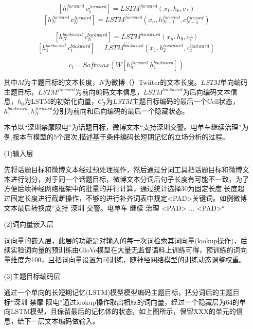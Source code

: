 \begin{equation}\label{lstm_f}[h^{forward}_{1}~c^{forward}_{1}] = LSTM^{forward}(x_1,h_0,c_T)\end{equation}
$$...$$
\begin{equation}\label{lstm_f}[h^{forward}_{N}~c^{forward}_{N}] = LSTM^{forward}(x_n,h^{forward}_{N-1},c^{forward}_{N-1})\end{equation}

\begin{equation}\label{lstm_f}[h^{backward}_{N}~c^{backward}_{N}] = LSTM^{backward}(x_n,h_0,c_T)\end{equation}
$$...$$
\begin{equation}\label{lstm_f}[h^{backward}_{1}~c^{backward}_{1}] = LSTM^{backward}(x_1,h^{backward}_{2},c^{backward}_{2})\end{equation}

\begin{equation}\label{lstm_f}c_i=Softmax(W[h^{forward}_n~h^{backward}_1])\end{equation}

其中$M$为主题目标的文本长度，$N$为微博（）Twiiter的文本长度。$LSTM$单向编码主题目标，$LSTM^{forward}$为前向编码文本信息，$LSTM^{backward}$为后向编码文本信息，$h_0$为LSTM的初始化向量，$C_T$为$LSTM$主题目标编码的最后一个Cell状态，$h^{backward}_{1},h^{forward}_{N}$分别为前向和后向编码的最后一个隐藏状态。

本节以“深圳禁摩限电”为话题目标，微博文本“支持深圳交警。电单车继续治理”为例,按本节模型的5个层次,描述基于条件编码长短期记忆的立场分析的过程。

(1)输入层

先将话题目标和微博文本经过预处理操作，然后通过分词工具把话题目标和微博文本进行划分，对于同一个话题目标，微博文本分词后句子长度有可能不一致，为了方便后续神经网络框架中的批量的并行计算，通过统计选择30为固定长度,长度超过固定长度进行截断操作，不够的进行补齐词表中规定<PAD>关键词。如例微博文本最后转换成”支持 深圳 交警。电单车 继续 治理 <PAD> ... <PAD>“

(2)词向量嵌入层

词向量的嵌入层，此层的功能是对输入的每一次词检索其词向量(lookup操作)，后续实验词向量的预训练由GloVe模型在大量无监督语料上训练可得，预训练的词向量维度为100，且把词向量设置为可训练，随神经网络模型的训练动态调整权重。

(3)主题目标编码层

通过一个单向的长短期记忆(LSTM)模型模型编码主题目标，把分词后的主题目标“深圳 禁摩 限电”通过lookup操作取出相应的词向量，经过一个隐藏层为64的单向LSTM模型，且保留最后的记忆体的状态，如上图所示，保留XXX的单元的信息，给下一层文本编码做输入。

